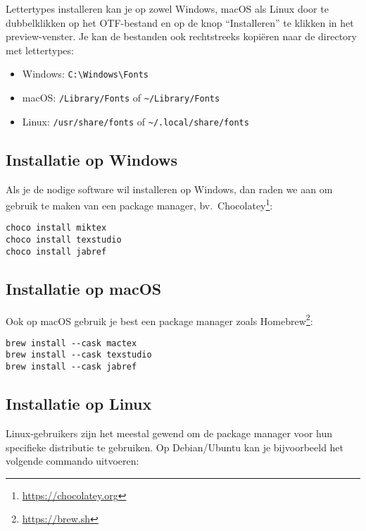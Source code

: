 Lettertypes installeren kan je op zowel Windows, macOS als Linux door te dubbelklikken op het OTF-bestand en op de knop ``Installeren'' te klikken in het preview-venster. Je kan de bestanden ook rechtstreeks kopiëren naar de directory met lettertypes:

\begin{itemize}
  \item Windows: \verb+C:\Windows\Fonts+
  \item macOS: \verb+/Library/Fonts+ of \verb+~/Library/Fonts+
  \item Linux: \verb+/usr/share/fonts+ of \verb+~/.local/share/fonts+
\end{itemize}

\subsection{Installatie op Windows}%
\label{ssec:installatie-op-windows}

Als je de nodige software wil installeren op Windows, dan raden we aan om gebruik te maken van een package manager, bv.\ Chocolatey\footnote{\url{https://chocolatey.org}}:

\begin{verbatim}
choco install miktex
choco install texstudio
choco install jabref
\end{verbatim}

\subsection{Installatie op macOS}%
\label{ssec:installatie-op-macos}

Ook op macOS gebruik je best een package manager zoals Homebrew\footnote{\url{https://brew.sh}}:

\begin{verbatim}
brew install --cask mactex
brew install --cask texstudio
brew install --cask jabref
\end{verbatim}

\subsection{Installatie op Linux}%
\label{ssec:installatie-op-linux}

Linux-gebruikers zijn het meestal gewend om de package manager voor hun specifieke distributie te gebruiken. Op Debian/Ubuntu kan je bijvoorbeeld het volgende commando uitvoeren:

